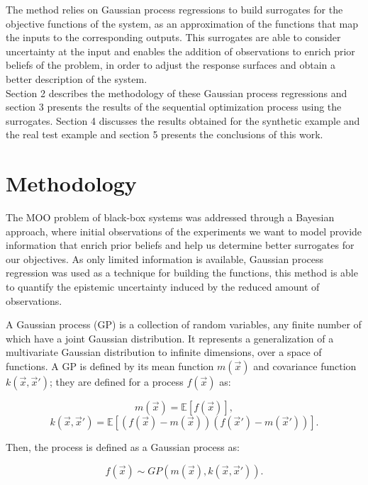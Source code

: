 \documentclass{article}
\begin{document}
The method relies on Gaussian process regressions to build surrogates for the objective functions of the system, as an approximation of the functions that map the inputs to the corresponding outputs. This surrogates are able to consider uncertainty at the input and enables the addition of observations to enrich prior beliefs of the problem, in order to adjust the response surfaces and obtain a better description of the system.\\

Section 2 describes the methodology of these Gaussian process regressions and section 3 presents the results of the sequential optimization process using the surrogates. Section 4 discusses the results obtained for the synthetic example and the real test example and section 5 presents the conclusions of this work.

\section{Methodology}

The MOO problem of black-box systems was addressed through a Bayesian approach, where initial observations of the experiments we want to model provide information that enrich prior beliefs and help us determine better surrogates for our objectives. As only limited information is available, Gaussian process regression was used as a technique for building the functions, this method is able to quantify the epistemic uncertainty induced by the reduced amount of observations.

A Gaussian process (GP) is a collection of random variables, any finite number of which have a joint Gaussian distribution\cite{Seeger2004}. It represents a generalization of a multivariate Gaussian distribution to infinite dimensions, over a space of functions. A GP is defined by its mean function $m(\vec{x})$ and covariance function $k(\vec{x},\vec{x}')$; they are defined for a process $f(\vec{x})$ as:

\begin{equation}
    m(\vec{x}) = \mathbb{E}[f(\vec{x})],
\end{equation}
\begin{equation}
    k(\vec{x},\vec{x}') = \mathbb{E}[(f(\vec{x})-m(\vec{x}))(f(\vec{x}')-m(\vec{x}'))].
\end{equation}

Then, the process is defined as a Gaussian process as: \cite{Seeger2004}

\begin{equation}
    f(\vec{x}) \sim GP(m(\vec{x}), k(\vec{x},\vec{x}')).
\end{equation}
\end{document}
